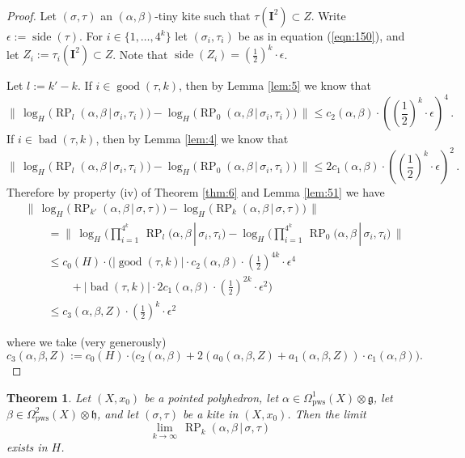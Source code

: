 \documentclass[10pt, a4paper]{amsart}
\newtheorem{thm}[equation]{Theorem}
\theoremstyle{definition}
\numberwithin{equation}{section}
\newcommand{\opn}{\operatorname}
\newcommand{\mfrak}[1]{\mathfrak{#1}}
\newcommand{\mbf}[1]{\mathbf{#1}}
\newcommand{\mrm}[1]{\mathrm{#1}}
\newcommand{\smfrac}[2]{{\textstyle \frac{#1}{#2}}}
\newcommand{\Norm}[1]{\bigl\lVert\, #1 \, \bigr\rVert}
\newcommand{\abs}[1]{\lvert #1 \rvert}
\renewcommand{\vert}{\, | \,}
\newcommand{\g}{\mfrak{g}}
\newcommand{\h}{\mfrak{h}}
\begin{document}
\begin{proof}
Let $(\sigma, \tau)$ an $(\alpha, \beta)$-tiny kite such that 
$\tau(\mbf{I}^2) \subset Z$. Write $\epsilon := \opn{side}(\tau)$. For 
$i \in \{ 1 ,\ldots, 4^k \}$ let $(\sigma_i, \tau_i)$ be as in equation
(\ref{eqn:150}), and let $Z_i := \tau_i(\mbf{I}^2) \subset Z$. 
Note that 
$\opn{side}(Z_i) = (\smfrac{1}{2})^k \cdot \epsilon$.

Let $l := k' - k$. If $i \in \opn{good}(\tau, k)$, then by Lemma 
\ref{lem:5} we know that
\[ \Norm{ \opn{log}_H \bigl( \opn{RP}_{l}(\alpha, \beta \vert 
\sigma_i, \tau_i) \bigr) -
\opn{log}_H \bigl( \opn{RP}_{0}(\alpha, \beta \vert \sigma_i, \tau_i)
\bigr) } \leq 
c_2(\alpha, \beta) \cdot ((\smfrac{1}{2})^k \cdot \epsilon)^4 \, . \]
If $i \in \opn{bad}(\tau, k)$, then by Lemma \ref{lem:4} we know that
\[ \Norm{ \opn{log}_H \bigl( \opn{RP}_{l}(\alpha, \beta \vert 
\sigma_i, \tau_i) \bigr) -
\opn{log}_H \bigl( \opn{RP}_{0}(\alpha, \beta \vert \sigma_i, \tau_i)
\bigr) } \leq 
2 c_1(\alpha, \beta) \cdot ((\smfrac{1}{2})^k \cdot \epsilon)^2 \, . \]
Therefore by property (iv) of Theorem \ref{thm:6}
and Lemma \ref{lem:51}  we have
\[ \begin{aligned}
& \Norm{ \opn{log}_H \bigl( \opn{RP}_{k'}(\alpha, \beta \vert 
\sigma, \tau) \bigr) -
\opn{log}_H \bigl( \opn{RP}_{k}(\alpha, \beta \vert \sigma, \tau) \bigr) } \\
& \qquad =
\Norm{ \opn{log}_H \bigl( 
\prod\nolimits_{i = 1}^{4^k} \, 
\opn{RP}_{l}(\alpha, \beta \vert \sigma_i, \tau_i \bigr) -
\opn{log}_H \bigl( 
\prod\nolimits_{i = 1}^{4^k} \, 
\opn{RP}_{0}(\alpha, \beta \vert \sigma_i, \tau_i \bigr) } \\
& \qquad \leq c_0(H) \cdot \bigl(
\abs{ \opn{good}(\tau, k) } \cdot c_2(\alpha, \beta) \cdot 
(\smfrac{1}{2})^{4 k} \cdot \epsilon^4 \\
& \qquad \qquad +
\abs{ \opn{bad}(\tau, k) } \cdot 2 c_1(\alpha, \beta) \cdot 
(\smfrac{1}{2})^{2 k} \cdot \epsilon^2 \bigr) \\
& \qquad \leq c_3(\alpha, \beta, Z) \cdot (\smfrac{1}{2})^k \cdot \epsilon^2 
\end{aligned} \]

where we take (very generously)
\[ c_3(\alpha, \beta, Z) := c_0(H) \cdot \bigl( c_2(\alpha, \beta) +
2 (a_0(\alpha, \beta, Z) + a_1(\alpha, \beta, Z)) \cdot c_1(\alpha, \beta)
\bigr) . \]
\end{proof}

\begin{thm} \label{thm:12}
Let $(X, x_0)$ be a pointed polyhedron, let
$\alpha \in \Omega^1_{\mrm{pws}}(X) \otimes \g$, let
$\beta \in \Omega^2_{\mrm{pws}}(X) \otimes \h$, and let
$(\sigma, \tau)$ be a kite in $(X, x_0)$. 
Then the limit
\[ \lim_{k \to \infty} \, \opn{RP}_{k}(\alpha, \beta \vert  \sigma, \tau)
\]
exists in $H$.
\end{thm}
\end{document}
